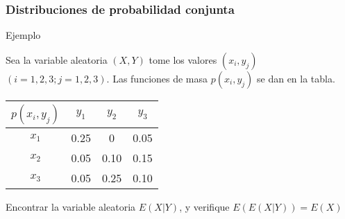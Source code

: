 \documentclass[spanish]{beamer}
\begin{document}
\begin{frame}
\frametitle{Distribuciones de probabilidad conjunta}
Ejemplo 

Sea la variable aleatoria $(X, Y)$ tome los valores $(x_{i}, y_{j})$ $(i = 1, 2, 3; j = 1, 2, 3)$. Las funciones de masa $p(x_{i}, y_{j})$ se dan en la tabla.

\begin{center}
\begin{tabular}{ c c c c } 
$p(x_{i},y_{j})$ & $y_{1}$ & $y_{2}$ & $y_{3}$\\
 \hline
 $x_{1}$ & 0.25 & 0  & 0.05\\ 
 $x_{2}$ & 0.05 & 0.10 & 0.15\\ 
 $x_{3}$ & 0.05 & 0.25 & 0.10\\ 
 \hline
\end{tabular}
\end{center}
Encontrar la variable aleatoria $E(X \vert Y )$, y verifique $E(E(X\vert Y )) = E(X)$
\end{frame}
\end{document}
